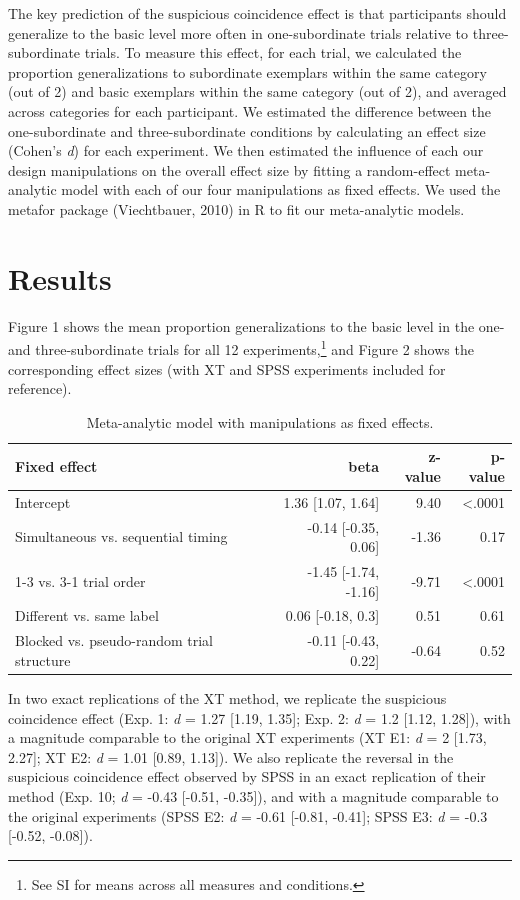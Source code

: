 \documentclass[english,floatsintext,man]{apa6}
\theoremstyle{definition}
\theoremstyle{definition}
\theoremstyle{definition}
\theoremstyle{remark}
\begin{document}
The key prediction of the suspicious coincidence effect is that
participants should generalize to the basic level more often in
one-subordinate trials relative to three-subordinate trials. To measure
this effect, for each trial, we calculated the proportion
generalizations to subordinate exemplars within the same category (out
of 2) and basic exemplars within the same category (out of 2), and
averaged across categories for each participant. We estimated the
difference between the one-subordinate and three-subordinate conditions
by calculating an effect size (Cohen's \emph{d}) for each experiment. We
then estimated the influence of each our design manipulations on the
overall effect size by fitting a random-effect meta-analytic model with
each of our four manipulations as fixed effects. We used the metafor
package (Viechtbauer, 2010) in R to fit our meta-analytic models.

\section{Results}\label{results}

Figure 1 shows the mean proportion generalizations to the basic level in
the one- and three-subordinate trials for all 12
experiments,\footnote{See SI for means across all measures and conditions.}
and Figure 2 shows the corresponding effect sizes (with XT and SPSS
experiments included for reference).

\begin{table}

\caption{\label{tab:unnamed-chunk-5}Meta-analytic model with manipulations as fixed effects.}
\centering
\fontsize{12}{14}\selectfont
\begin{tabular}[t]{lrrr}
\toprule
Fixed effect & beta & z-value & p-value\\
\midrule
Intercept & 1.36 [1.07, 1.64] & 9.40 & <.0001\\
Simultaneous vs. sequential timing & -0.14 [-0.35, 0.06] & -1.36 & 0.17\\
1-3 vs. 3-1 trial order & -1.45 [-1.74, -1.16] & -9.71 & <.0001\\
Different vs. same label & 0.06 [-0.18, 0.3] & 0.51 & 0.61\\
Blocked vs. pseudo-random trial structure & -0.11 [-0.43, 0.22] & -0.64 & 0.52\\
\bottomrule
\end{tabular}
\end{table}

In two exact replications of the XT method, we replicate the suspicious
coincidence effect (Exp. 1: \emph{d} = 1.27 {[}1.19, 1.35{]}; Exp. 2:
\emph{d} = 1.2 {[}1.12, 1.28{]}), with a magnitude comparable to the
original XT experiments (XT E1: \emph{d} = 2 {[}1.73, 2.27{]}; XT E2:
\emph{d} = 1.01 {[}0.89, 1.13{]}). We also replicate the reversal in the
suspicious coincidence effect observed by SPSS in an exact replication
of their method (Exp. 10; \emph{d} = -0.43 {[}-0.51, -0.35{]}), and with
a magnitude comparable to the original experiments (SPSS E2: \emph{d} =
-0.61 {[}-0.81, -0.41{]}; SPSS E3: \emph{d} = -0.3 {[}-0.52, -0.08{]}).
\end{document}
